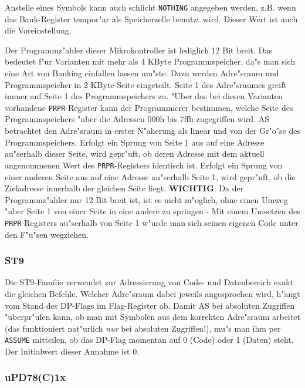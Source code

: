 \documentclass[12pt,a4paper,twoside]{report}
\newcommand{\tty}[1]{{\tt #1}}
\begin{document}
Anstelle eines Symbols kann auch schlicht \tty{NOTHING} angegeben
werden, z.B. wenn das Bank-Register tempor"ar als Speicherzelle benutzt
wird.  Dieser Wert ist auch die Voreinstellung.

Der Programmz"ahler dieser Mikrokontroller ist lediglich 12 Bit breit.  Das
bedeutet f"ur Varianten mit mehr als 4 KByte Programmspeicher, da"s man sich
eine Art von Banking einfallen lassen mu"ste.  Dazu werden Adre"sraum und
Programmspeicher in 2 KByte-Seite eingeteilt.  Seite 1 des Adre"sraumes
greift immer auf Seite 1 des Programmspeichers zu.  "Uber das bei diesen
Varianten vorhandene \tty{PRPR}-Register kann der Programmierer bestimmen,
welche Seite des Programmspeichers "uber die Adressen 000h bis 7ffh
zugegriffen wird.  AS betrachtet den Adre"sraum in erster N"aherung als
linear und von der Gr"o"se des Programmspeichers.  Erfolgt ein Sprung von
Seite 1 aus auf eine Adresse au"serhalb dieser Seite, wird gepr"uft, ob deren
Adresse mit dem aktuell angenommenen Wert des \tty{PRPR}-Registers identisch
ist.  Erfolgt ein Sprung von einer anderen Seite aus auf eine Adresse au"serhalb
Seite 1, wird gepr"uft, ob die Zieladresse innerhalb der gleichen Seite
liegt.  {\bf WICHTIG}: Da der Programmz"ahler nur 12 Bit breit ist, ist
es nicht m"oglich, ohne einen Umweg "uber Seite 1 von einer Seite in eine
andere zu springen - Mit einem Umsetzen des \tty{PRPR}-Registers au"serhalb
von Seite 1 w"urde man sich seinen eigenen Code unter den F"u"sen wegziehen.


\subsubsection{ST9}

Die ST9-Familie verwendet zur Adressierung von Code- und Datenbereich
exakt die gleichen Befehle.  Welcher Adre"sraum dabei jeweils
angesprochen wird, h"angt vom Stand des DP-Flags im Flag-Register ab.
Damit AS bei absoluten Zugriffen "uberpr"ufen kann, ob man mit Symbolen
aus dem korrekten Adre"sraum arbeitet (das funktioniert nat"urlich {\em nur}
bei absoluten Zugriffen!), mu"s man ihm per \tty{ASSUME} mitteilen, ob das
DP-Flag momentan auf 0 (Code) oder 1 (Daten) steht.  Der Initialwert
dieser Annahme ist 0.


\subsubsection{uPD78(C)1x}
\end{document}
